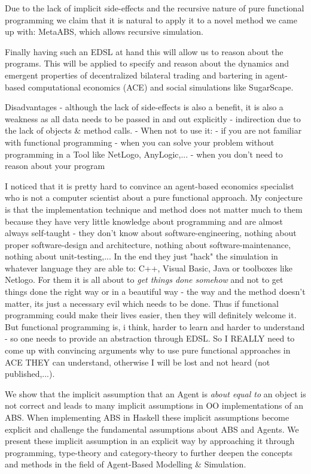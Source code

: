 Due to the lack of implicit side-effects and the recursive nature of pure functional programming we claim that it is natural to apply it to a novel method we came up with: MetaABS, which allows recursive simulation.

Finally having such an EDSL at hand this will allow us to reason about the programs. This will be applied to specify and reason about the dynamics and emergent properties of decentralized bilateral trading and bartering in agent-based computational economics (ACE) and social simulations like SugarScape.

Disadvantages
- although the lack of side-effects is also a benefit, it is also a weakness as all data needs to be passed in and out explicitly 
- indirection due to the lack of objects \& method calls.
- When not to use it: 
	- if you are not familiar with functional programming
	- when you can solve your problem without programming in a Tool like NetLogo, AnyLogic,...
	- when you don't need to reason about your program
	
I noticed that it is pretty hard to convince an agent-based economics specialist who is not a computer scientist about a pure functional approach. My conjecture is that the implementation technique and method does not matter much to them because they have very little knowledge about programming and are almost always self-taught - they don't know about software-engineering, nothing about proper software-design and architecture, nothing about software-maintenance, nothing about unit-testing,... In the end they just "hack" the simulation in whatever language they are able to: C++, Visual Basic, Java or toolboxes like Netlogo. For them it is all about to \textit{get things done somehow} and not to get things done the right way or in a beautiful way - the way and the method doesn't matter, its just a necessary evil which needs to be done. Thus if functional programming could make their lives easier, then they will definitely welcome it. But functional programming is, i think, harder to learn and harder to understand - so one needs to provide an abstraction through EDSL. So I REALLY need to come up with convincing arguments why to use pure functional approaches in ACE THEY can understand, otherwise I will be lost and not heard (not published,...). 


We show that the implicit assumption that an Agent is \textit{about equal to} an object is not correct and leads to many implicit assumptions in OO implementations of an ABS. When implementing ABS in Haskell these implicit assumptions become explicit and challenge the fundamental assumptions about ABS and Agents. We present these implicit assumption in an explicit way by approaching it through programming, type-theory and category-theory to further deepen the concepts and methods in the field of Agent-Based Modelling \& Simulation.

